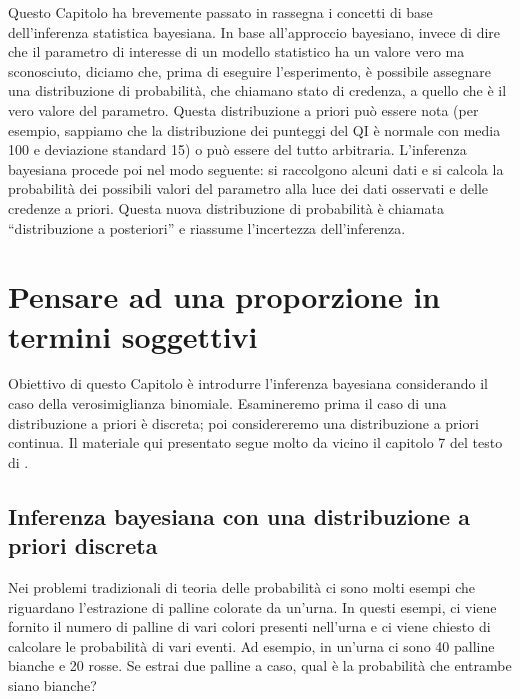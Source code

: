 \documentclass[
  11pt,
]{krantz}
\theoremstyle{definition}
\theoremstyle{definition}
\theoremstyle{definition}
\theoremstyle{definition}
\theoremstyle{remark}
\begin{document}
Questo Capitolo ha brevemente passato in rassegna i concetti di base dell'inferenza statistica bayesiana. In base all'approccio bayesiano, invece di dire che il parametro di interesse di un modello statistico ha un valore vero ma sconosciuto, diciamo che, prima di eseguire l'esperimento, è possibile assegnare una distribuzione di probabilità, che chiamano stato di credenza, a quello che è il vero valore del parametro. Questa distribuzione a priori può essere nota (per esempio, sappiamo che la distribuzione dei punteggi del QI è normale con media 100 e deviazione standard 15) o può essere del tutto arbitraria. L'inferenza bayesiana procede poi nel modo seguente: si raccolgono alcuni dati e si calcola la probabilità dei possibili valori del parametro alla luce dei dati osservati e delle credenze a priori. Questa nuova distribuzione di probabilità è chiamata ``distribuzione a posteriori'' e riassume l'incertezza dell'inferenza.

\hypertarget{ch-subj-think-prop}{%
\chapter{Pensare ad una proporzione in termini soggettivi}\label{ch-subj-think-prop}}

Obiettivo di questo Capitolo è introdurre l'inferenza bayesiana considerando il caso della verosimiglianza binomiale. Esamineremo prima il caso di una distribuzione a priori è discreta; poi considereremo una distribuzione a priori continua. Il materiale qui presentato segue molto da vicino il capitolo 7 del testo di \citet{albert2019probability}.

\hypertarget{ch-prior-discr-binom}{%
\section{Inferenza bayesiana con una distribuzione a priori discreta}\label{ch-prior-discr-binom}}

Nei problemi tradizionali di teoria delle probabilità ci sono molti esempi che riguardano l'estrazione di palline colorate da un'urna. In questi esempi, ci viene fornito il numero di palline di vari colori presenti nell'urna e ci viene chiesto di calcolare le probabilità di vari eventi. Ad esempio, in un'urna ci sono 40 palline bianche e 20 rosse. Se estrai due palline a caso, qual è la probabilità che entrambe siano bianche?
\end{document}
